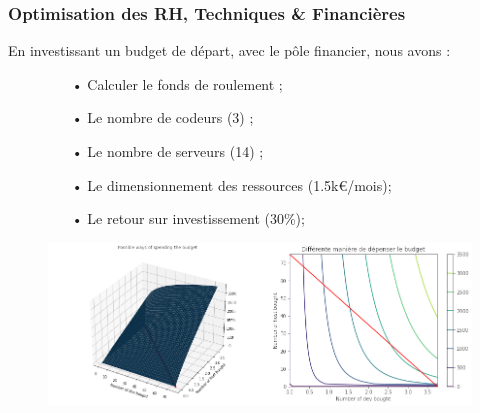 \documentclass[9pt]{beamer}
\begin{document}
\begin{frame}
	\frametitle{Optimisation des RH, Techniques \& Financières}
	En investissant un budget de départ, avec le pôle financier, nous avons :
\begin{figure}[!htb]
   \begin{minipage}{0.5\textwidth}
     \centering
     \begin{itemize} 
		\item[•] Calculer le fonds de roulement ;
      	\item[•] Le nombre de codeurs (3) ;
     	\item[•] Le nombre de serveurs (14) ;
     	\item[•] Le dimensionnement des ressources (1.5k€/mois);
     	\item[•] Le retour sur investissement (30\%);
	 \end{itemize}	
   \end{minipage}\hfill
   \begin{minipage}{0.5\textwidth}
     \centering
     \includegraphics[width=1\linewidth]{../plots/optimisation}
     \label{Fig:optimisation}
   \end{minipage}
\end{figure}
\end{frame}
\end{document}
